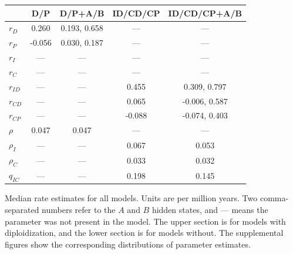 \begin{supptable}
\begin{center}
    \vspace{12pt}
    \begin{tabular}{lcccc}
                       & D/P   & D/P+A/B      & ID/CD/CP & ID/CD/CP+A/B \\ \midrule
        $r_D$          & 0.260 & 0.193, 0.658 & ---      & ---          \\
        $r_P$          &-0.056 & 0.030, 0.187 & ---      & ---          \\
        $r_I$          & ---   & ---          & ---      & ---          \\
        $r_C$          & ---   & ---          & ---      & ---          \\
        $r_{ID}$       & ---   & ---          & 0.455    & 0.309, 0.797 \\
        $r_{CD}$       & ---   & ---          & 0.065    &-0.006, 0.587 \\
        $r_{CP}$       & ---   & ---          &-0.088    &-0.074, 0.403 \\
        $\rho$         & 0.047 & 0.047        & ---      & ---          \\
        $\rho_I$       & ---   & ---          & 0.067    & 0.053        \\
        $\rho_C$       & ---   & ---          & 0.033    & 0.032        \\
        $q_{IC}$       & ---   & ---          & 0.198    & 0.145        
    \end{tabular}
    \end{center}
    \caption{
        Median rate estimates for all models.
        Units are per million years.
        Two comma-separated numbers refer to the $A$ and $B$ hidden states, and --- means the parameter was not present in the model.
        The upper section is for models with diploidization, and the lower section is for models without.
        The supplemental figures show the corresponding distributions of parameter estimates.
    }
    \label{table:estimates}
\end{supptable}

